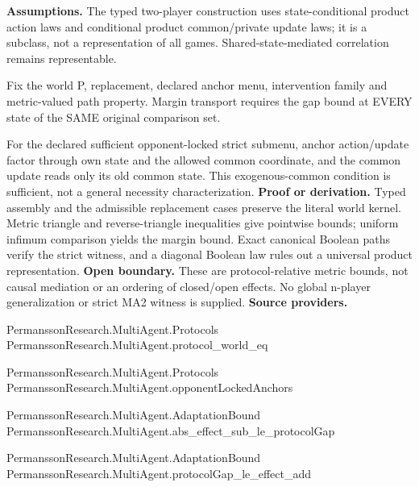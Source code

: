 \documentclass[11pt,a4paper]{article}
\begin{document}
\textbf{Assumptions.} The typed two-player construction uses state-conditional product action laws and conditional product common/private update laws; it is a subclass, not a representation of all games. Shared-state-mediated correlation remains representable.

Fix the world P, replacement, declared anchor menu, intervention family and metric-valued path property. Margin transport requires the gap bound at EVERY state of the SAME original comparison set.

For the declared sufficient opponent-locked strict submenu, anchor action/update factor through own state and the allowed common coordinate, and the common update reads only its old common state. This exogenous-common condition is sufficient, not a general necessity characterization.
\textbf{Proof or derivation.} Typed assembly and the admissible replacement cases preserve the literal world kernel. Metric triangle and reverse-triangle inequalities give pointwise bounds; uniform infimum comparison yields the margin bound. Exact canonical Boolean paths verify the strict witness, and a diagonal Boolean law rules out a universal product representation.
\textbf{Open boundary.} These are protocol-relative metric bounds, not causal mediation or an ordering of closed/open effects. No global n-player generalization or strict MA2 witness is supplied.
\textbf{Source providers.}
{\footnotesize\raggedright PermanssonRe\allowbreak{}search.Multi\allowbreak{}Agent.Protoc\allowbreak{}ols\\ PermanssonRe\allowbreak{}search.Multi\allowbreak{}Agent.protoc\allowbreak{}ol\_world\_eq\par}
{\footnotesize\raggedright PermanssonRe\allowbreak{}search.Multi\allowbreak{}Agent.Protoc\allowbreak{}ols\\ PermanssonRe\allowbreak{}search.Multi\allowbreak{}Agent.oppone\allowbreak{}ntLockedAnch\allowbreak{}ors\par}
{\footnotesize\raggedright PermanssonRe\allowbreak{}search.Multi\allowbreak{}Agent.Adapta\allowbreak{}tionBound\\ PermanssonRe\allowbreak{}search.Multi\allowbreak{}Agent.abs\_ef\allowbreak{}fect\_sub\_le\_\allowbreak{}protocolGap\par}
{\footnotesize\raggedright PermanssonRe\allowbreak{}search.Multi\allowbreak{}Agent.Adapta\allowbreak{}tionBound\\ PermanssonRe\allowbreak{}search.Multi\allowbreak{}Agent.protoc\allowbreak{}olGap\_le\_eff\allowbreak{}ect\_add\par}
\end{document}
